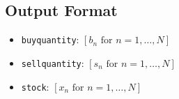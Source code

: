\documentclass{article}
\begin{document}
\subsection*{Output Format}
\begin{itemize}
    \item \texttt{buyquantity}: $[b_n \text{ for } n = 1,\ldots,N]$
    \item \texttt{sellquantity}: $[s_n \text{ for } n = 1,\ldots,N]$
    \item \texttt{stock}: $[x_n \text{ for } n = 1,\ldots,N]$
\end{itemize}
\end{document}
